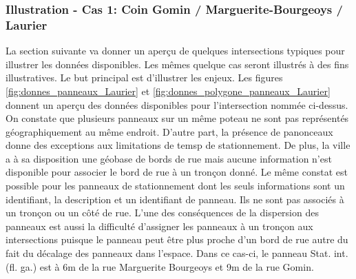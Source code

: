     \subsubsection{Illustration - Cas 1: Coin Gomin / Marguerite-Bourgeoys / Laurier}
    La section suivante va donner un aperçu de quelques intersections typiques pour illustrer les données disponibles. Les mêmes quelque cas seront illustrés à des fins illustratives. Le but principal est d'illustrer les enjeux.
      Les figures \ref{fig:donnes_panneaux_Laurier} et \ref{fig:donnes_polygone_panneaux_Laurier} donnent un aperçu des données disponibles pour l'intersection nommée ci-dessus. On constate que plusieurs panneaux sur un même poteau ne sont pas représentés géographiquement au même endroit. D'autre part, la présence de panonceaux donne des exceptions aux limitations de temsp de stationnement. De plus, la ville a à sa disposition une géobase de bords de rue mais aucune information n'est disponible pour associer le bord de rue à un tronçon donné. Le même constat est possible pour les panneaux de stationnement dont les seuls informations sont un identifiant, la description et un identifiant de panneau. Ils ne sont pas associés à un tronçon ou un côté de rue. L'une des conséquences de la dispersion des panneaux est aussi la difficulté d'assigner les panneaux à un tronçon aux intersections puisque le panneau peut être plus proche d'un bord de rue autre du fait du décalage des panneaux dans l'espace. Dans ce cas-ci, le panneau Stat. int. (fl. ga.) est à 6m de la rue Marguerite Bourgeoys et 9m de la rue Gomin.
